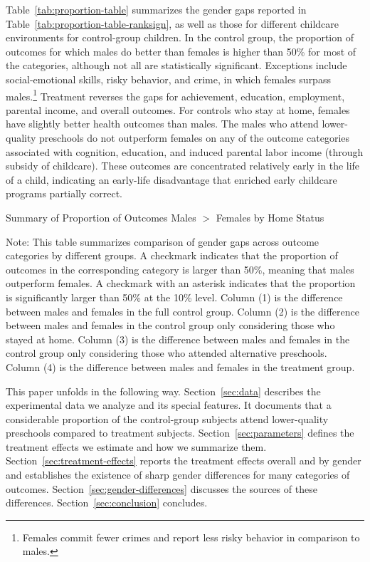 Table~\ref{tab:proportion-table} summarizes the gender gaps reported in Table~\ref{tab:proportion-table-ranksign}, as well as those for different childcare environments for control-group children. In the control group, the proportion of outcomes for which males do better than females is higher than 50\% for most of the categories, although not all are statistically significant. Exceptions include social-emotional skills, risky behavior, and crime, in which females surpass males.\footnote{Females commit fewer crimes and report less risky behavior in comparison to males.} Treatment reverses the gaps for achievement, education, employment, parental income, and overall outcomes. For controls who stay at home, females have slightly better health outcomes than males. The males who attend lower-quality preschools do not outperform females on any of the outcome categories associated with cognition, education, and induced parental labor income (through subsidy of childcare). These outcomes are concentrated relatively early in the life of a child, indicating an early-life disadvantage that enriched early childcare programs partially correct.

\begin{table}[H]
\centering
\caption{Summary of Proportion of Outcomes Males $>$ Females by Home Status}
\label{tab:proportion-table}
\begin{threeparttable}

\begin{tablenotes}
\footnotesize
\item Note: This table summarizes comparison of gender gaps across outcome categories by different groups. A checkmark indicates that the proportion of outcomes in the corresponding category is larger than 50\%, meaning that males outperform females. A checkmark with an asterisk indicates that the proportion is significantly larger than 50\% at the 10\% level. Column (1) is the difference between males and females in the full control group.  Column (2) is the difference between males and females in the control group only considering those who stayed at home. Column (3) is the difference between males and females in the control group only considering those who attended alternative preschools. Column (4) is the difference between males and females in the treatment group.
\end{tablenotes}
\end{threeparttable}
\end{table}

This paper unfolds in the following way. Section~\ref{sec:data} describes the experimental data we analyze and its special features. It documents that a considerable proportion of the control-group subjects attend lower-quality preschools compared to treatment subjects. Section~\ref{sec:parameters} defines the treatment effects we estimate and how we summarize them. Section~\ref{sec:treatment-effects} reports the treatment effects overall and by gender and establishes the existence of sharp gender differences for many categories of outcomes. Section~\ref{sec:gender-differences} discusses the sources of these differences. Section~\ref{sec:conclusion} concludes.


